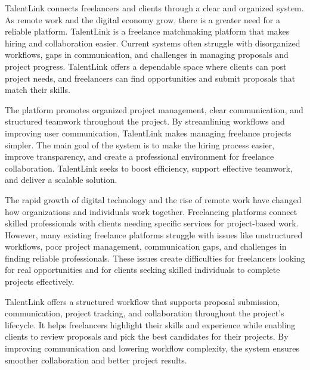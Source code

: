 \documentclass[12pt,a4paper,oneside]{report}
\numberwithin{figure}{chapter}
\numberwithin{table}{chapter}
\begin{document}
{\fontsize{12}{16}\selectfont\onehalfspacing
\indent TalentLink connects freelancers and clients through a clear and organized system.
As remote work and the digital economy grow, there is a greater need for a reliable
platform. TalentLink is a freelance matchmaking platform that makes hiring and
collaboration easier. Current systems often struggle with disorganized workflows, gaps
in communication, and challenges in managing proposals and project progress. TalentLink
offers a dependable space where clients can post project needs, and freelancers can find
opportunities and submit proposals that match their skills.

\indent The platform promotes organized project management, clear communication, and
structured teamwork throughout the project. By streamlining workflows and improving user
communication, TalentLink makes managing freelance projects simpler. The main goal of the
system is to make the hiring process easier, improve transparency, and create a
professional environment for freelance collaboration. TalentLink seeks to boost
efficiency, support effective teamwork, and deliver a scalable solution.

\indent The rapid growth of digital technology and the rise of remote work have changed
how organizations and individuals work together. Freelancing platforms connect skilled
professionals with clients needing specific services for project-based work. However,
many existing freelance platforms struggle with issues like unstructured workflows, poor
project management, communication gaps, and challenges in finding reliable professionals.
These issues create difficulties for freelancers looking for real opportunities and for
clients seeking skilled individuals to complete projects effectively.

\indent TalentLink offers a structured workflow that supports proposal submission,
communication, project tracking, and collaboration throughout the project's lifecycle.
It helps freelancers highlight their skills and experience while enabling clients to
review proposals and pick the best candidates for their projects. By improving
communication and lowering workflow complexity, the system ensures smoother collaboration
and better project results.
}

\newpage
\thispagestyle{plain}
{\setlength{\parskip}{0pt}
\tableofcontents}

\newpage
\thispagestyle{plain}
{\setlength{\parskip}{0pt}
\listoffigures}
\end{document}
